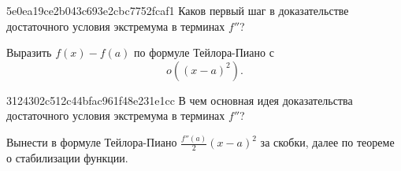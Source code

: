 \begin{note}{5e0ea19ce2b043c693e2cbc7752fcaf1}
    Каков первый шаг в доказательстве достаточного условия экстремума в терминах \( f'' \)?

    \begin{cloze}{1}
        Выразить \( f(x) - f(a) \)  по формуле Тейлора-Пиано с
        \[
            o((x - a)^2 ).
        \]
    \end{cloze}
\end{note}

\begin{note}{3124302c512c44bfac961f48e231e1cc}
    В чем основная идея доказательства достаточного условия экстремума в терминах \( f'' \)?

    \begin{cloze}{1}
        Вынести в формуле Тейлора-Пиано \( \frac{f''(a)}{2} (x - a)^2  \) за скобки, далее по теореме о стабилизации функции.
    \end{cloze}
\end{note}


